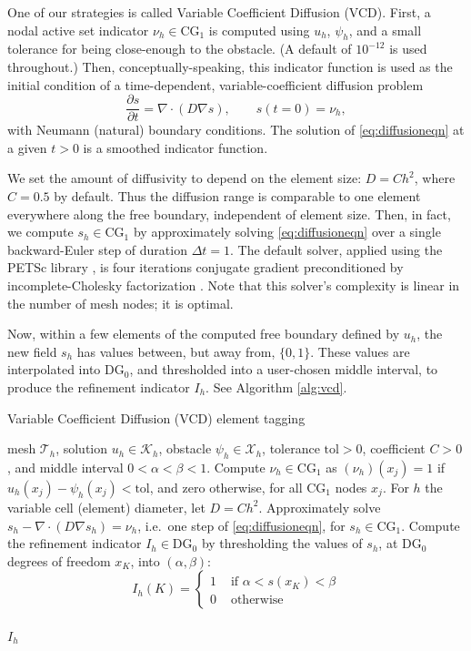 \documentclass[]{interact}
\theoremstyle{plain}%
\theoremstyle{definition}
\theoremstyle{remark}
\newcommand{\grad}{\nabla}
\newcommand{\Div}{\nabla\cdot}
\newcommand{\cK}{\mathcal{K}}
\newcommand{\cT}{\mathcal{T}}
\newcommand{\cX}{\mathcal{X}}
\newcommand{\CG}{\text{CG}}
\newcommand{\DG}{\text{DG}}
\begin{document}
One of our strategies is called Variable Coefficient Diffusion (VCD).  First, a nodal active set indicator $\nu_h \in \CG_1$ is computed using $u_h$, $\psi_h$, and a small tolerance for being close-enough to the obstacle.  (A default of $10^{-12}$ is used throughout.)  Then, conceptually-speaking, this indicator function is used as the initial condition of a time-dependent, variable-coefficient diffusion problem
\begin{equation} \label{eq:diffusioneqn}
\frac{\partial s}{\partial t} = \Div\left(D \grad s\right), \qquad s(t=0) = \nu_h,
\end{equation}
with Neumann (natural) boundary conditions.  The solution of \eqref{eq:diffusioneqn} at a given $t>0$ is a smoothed indicator function.

We set the amount of diffusivity to depend on the element size: $D=C h^2$, where $C=0.5$ by default.  Thus the diffusion range is comparable to one element everywhere along the free boundary, independent of element size.  Then, in fact, we compute $s_h\in\CG_1$ by approximately solving \eqref{eq:diffusioneqn} over a single backward-Euler step of duration $\Delta t = 1$.  The default solver, applied using the PETSc library \cite{petsc-user-ref}, is four iterations conjugate gradient preconditioned by incomplete-Cholesky factorization \cite{Bueler2021}.  Note that this solver's complexity is linear in the number of mesh nodes; it is optimal.

Now, within a few elements of the computed free boundary defined by $u_h$, the new field $s_h$ has values between, but away from, $\{0,1\}$.  These values are interpolated into $\DG_0$, and thresholded into a user-chosen middle interval, to produce the refinement indicator $I_h$.  See Algorithm \ref{alg:vcd}. 

\begin{algorithm}[H]
	\caption{Variable Coefficient Diffusion (VCD) element tagging}
	\begin{algorithmic}[1]
		\Require mesh $\cT_h$, solution $u_h \in \cK_h$, obstacle $\psi_h \in \cX_h$, tolerance $\text{tol} > 0$, coefficient $C>0$, and middle interval $0 < \alpha < \beta < 1$.
		\State Compute $\nu_h \in \CG_1$ as $(\nu_h)(x_j)=1$ if $u_h(x_j) - \psi_h(x_j)<\text{tol}$, and zero otherwise, for all $\CG_1$ nodes $x_j$.
		\State For $h$ the variable cell (element) diameter, let $D=C h^2$.
		\State Approximately solve $s_h - \Div(D \grad s_h) = \nu_h$, i.e.~one step of \eqref{eq:diffusioneqn}, for $s_h\in\CG_1$.
		\State Compute the refinement indicator $I_h \in \DG_0$ by thresholding the values of $s_h$, at $\DG_0$ degrees of freedom $x_K$, into $(\alpha,\beta)$:
		\begin{equation*}
		  I_h(K) = \begin{cases}
			1 & \text{ if } \alpha < s(x_K) < \beta\\
			0 & \text{ otherwise}
		  \end{cases}
		\end{equation*}\\
		\Return $I_h$
	\end{algorithmic}
\label{alg:vcd}
\end{algorithm}
\end{document}
